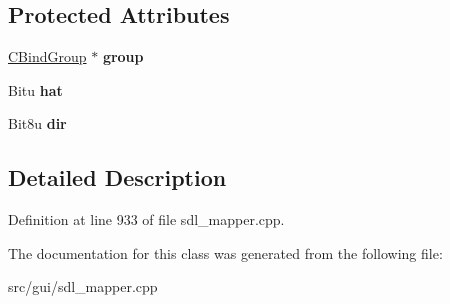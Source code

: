 \subsection*{Protected Attributes}
\begin{DoxyCompactItemize}
\item 
\hypertarget{classCJHatBind_a29b7138a9094d140fad3bb6bef01b3e2}{\hyperlink{classCBindGroup}{C\-Bind\-Group} $\ast$ {\bfseries group}}\label{classCJHatBind_a29b7138a9094d140fad3bb6bef01b3e2}

\item 
\hypertarget{classCJHatBind_a652e1ca02ee3c415917d41bd557a25ba}{Bitu {\bfseries hat}}\label{classCJHatBind_a652e1ca02ee3c415917d41bd557a25ba}

\item 
\hypertarget{classCJHatBind_a2b02bbb8de4fc7bb9941f535254dad19}{Bit8u {\bfseries dir}}\label{classCJHatBind_a2b02bbb8de4fc7bb9941f535254dad19}

\end{DoxyCompactItemize}


\subsection{Detailed Description}


Definition at line 933 of file sdl\-\_\-mapper.\-cpp.



The documentation for this class was generated from the following file\-:\begin{DoxyCompactItemize}
\item 
src/gui/sdl\-\_\-mapper.\-cpp\end{DoxyCompactItemize}
